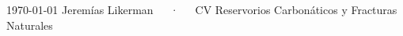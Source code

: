 \documentclass[11pt, a4paper]{awesome-cv}
\begin{document}
\makecvheader

\makecvfooter
  {\today}
  {Jeremías Likerman~~~·~~~CV Reservorios Carbonáticos y Fracturas Naturales}
  {\thepage}

\vspace{.2cm}




\newpage




\end{document}

